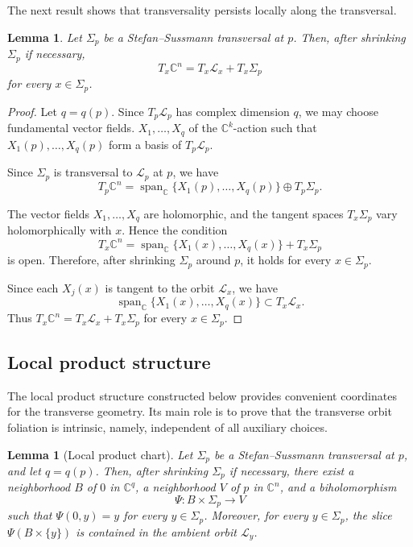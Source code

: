 \documentclass[11pt]{amsart}
\newtheorem{lemma}[theorem]{Lemma}
\theoremstyle{definition}
\theoremstyle{remark}
\newcommand{\C}{\mathbb{C}}
\newcommand{\leaf}[1]{\mathcal{L}_{#1}}
\begin{document}
The next result shows that transversality persists locally along the transversal.

\begin{lemma}
	Let $\Sigma_p$ be a  Stefan--Sussmann transversal at $p$.
	Then, after shrinking $\Sigma_p$ if necessary, 
	\[
		T_x\C^n = T_x\leaf{x} + T_x\Sigma_p
	\]
	for every $x\in\Sigma_p$.
\end{lemma}

\begin{proof}
	Let $q=q(p)$.
	Since $T_p\leaf{p}$ has complex dimension $q$, we may choose fundamental vector fields.
	$X_1,\ldots,X_q$ of the $\C^k$-action such that $X_1(p),\ldots,X_q(p)$ form a basis of $T_p\leaf{p}$.

	Since $\Sigma_p$ is transversal to $\leaf{p}$ at $p$, we have 
	$$ 
		T_p\C^n = \operatorname{span}_{\C}\{X_1(p),\ldots,X_q(p)\} \oplus T_p\Sigma_p.
	$$

	The vector fields $X_1,\ldots,X_q$ are holomorphic, and the tangent spaces $T_x\Sigma_p$ vary holomorphically with $x$.
	Hence the condition 
	\[
		T_x\C^n = \operatorname{span}_{\C}\{X_1(x),\ldots,X_q(x)\} + T_x\Sigma_p
	\]
 	is open.
	Therefore, after shrinking $\Sigma_p$ around $p$, it holds for every $x\in\Sigma_p$.

	Since each $X_j(x)$ is tangent to the orbit $\leaf{x}$, we have 
	$$ 
		\operatorname{span}_{\C}\{X_1(x),\ldots,X_q(x)\} \subset T_x\leaf{x}.
	$$
	Thus $ T_x\C^n = T_x\leaf{x} + T_x\Sigma_p $ for every $x\in\Sigma_p$.
\end{proof}

\subsection{Local product structure}

The local product structure constructed below provides convenient coordinates for the transverse geometry.
Its main role is to prove that the transverse orbit foliation is intrinsic, namely, independent of all auxiliary choices.

\begin{lemma}[Local product chart]\label{lem:Local product chart} 
	Let $\Sigma_p$ be a Stefan--Sussmann transversal at $p$, and let $q=q(p)$.
	Then, after shrinking $\Sigma_p$ if necessary, there exist a neighborhood $B$ of $0$ in $\C^q$, a neighborhood $V$ of $p$ in $\C^n$, and a biholomorphism 
	\[
		\Psi:B\times\Sigma_p\longrightarrow V
	\]
	such that 
	$\Psi(0,y)=y$ for every $y\in\Sigma_p$.
	Moreover, for every $y\in\Sigma_p$, the slice $\Psi(B\times\{y\})$ is contained in the ambient orbit $\leaf{y}$.
\end{lemma}
\end{document}
